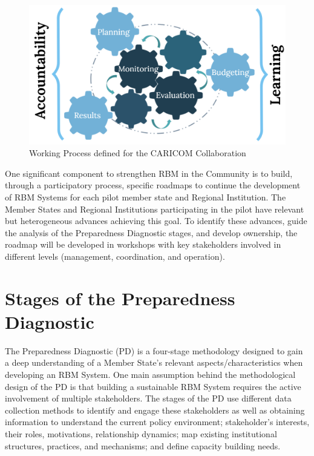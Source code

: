 \documentclass[
  10pt,
]{book}
\begin{document}
\begin{figure}
\includegraphics[width=1\linewidth]{./images/figure_3} \caption{Working Process defined for the CARICOM Collaboration}\label{fig:figure3}
\end{figure}

One significant component to strengthen RBM in the Community is to build, through a participatory process, specific roadmaps to continue the development of RBM Systems for each pilot member state and Regional Institution. The Member States and Regional Institutions participating in the pilot have relevant but heterogeneous advances achieving this goal. To identify these advances, guide the analysis of the Preparedness Diagnostic stages, and develop ownership, the roadmap will be developed in workshops with key stakeholders involved in different levels (management, coordination, and operation).

\hypertarget{stages-of-the-preparedness-diagnostic}{%
\section{Stages of the Preparedness Diagnostic}\label{stages-of-the-preparedness-diagnostic}}

The Preparedness Diagnostic (PD) is a four-stage methodology designed to gain a deep understanding of a Member State's relevant aspects/characteristics when developing an RBM System. One main assumption behind the methodological design of the PD is that building a sustainable RBM System requires the active involvement of multiple stakeholders. The stages of the PD use different data collection methods to identify and engage these stakeholders as well as obtaining information to understand the current policy environment; stakeholder's interests, their roles, motivations, relationship dynamics; map existing institutional structures, practices, and mechanisms; and define capacity building needs.
\end{document}
